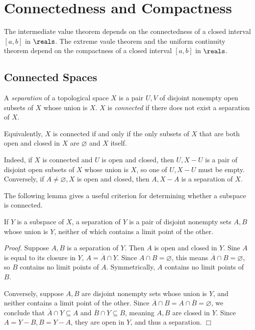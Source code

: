 \section{Connectedness and Compactness}
The intermediate value theorem depends on the connectedness of a closed interval $[a, b]$ in $\reals$. The extreme vaule theorem and the uniform continuity theorem depend on the compactness of a closed interval $[a, b]$ in $\reals$.

\subsection{Connected Spaces}
\begin{definition}\label{3.1}
    A {\it separation} of a topological space $X$ is a pair $U, V$ of disjoint nonempty open subsets of $X$ whose union is $X$. $X$ is {\it connected} if there does not exist a separation of $X$.
\end{definition}
Equivalently, $X$ is connected if and only if the only subsets of $X$ that are both open and closed in $X$ are $\varnothing$ and $X$ itself.

Indeed, if $X$ is connected and $U$ is open and closed, then $U, X-U$ is a pair of disjoint open subsets of $X$ whose union is $X$, so one of $U, X - U$ must be empty. Conversely, if $A \neq \varnothing, X$ is open and closed, then $A, X - A$ is a separation of $X$.

The following lemma gives a useful criterion for determining whether a subspace is connected.

\begin{lemma}\label{3.2}
    If $Y$ is a subspace of $X$, a separation of $Y$ is a pair of disjoint nonempty sets $A, B$ whose union is $Y$, neither of which contains a limit point of the other.
\end{lemma}
{\it Proof.} Suppose $A, B$ is a separation of $Y$. Then $A$ is open and closed in $Y$. Sine $A$ is equal to its closure in $Y$, $A = \overline{A} \cap Y$. Since $A \cap B = \varnothing$, this means $\overline{A} \cap B = \varnothing$, so $B$ contains no limit points of $A$. Symmetrically, $A$ contains no limit points of $B$.

Conversely, suppose $A, B$ are disjoint nonempty sets whose union is $Y$, and neither contains a limit point of the other. Since $\overline{A} \cap B = A \cap \overline{B} = \varnothing$, we conclude that $\overline{A} \cap Y \subseteq A$ and $\overline{B} \cap Y \subseteq B$, meaning $A, B$ are closed in $Y$. Since $A = Y-B, B = Y-A$, they are open in $Y$, and thus a separation. $\Box$

